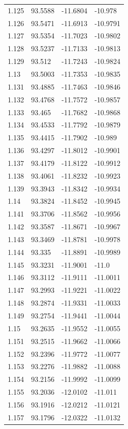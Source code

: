 \begin{tabular}{llll}
1.125 & 93.5588 & -11.6804 & -10.978 \\
1.126 & 93.5471 & -11.6913 & -10.9791 \\
1.127 & 93.5354 & -11.7023 & -10.9802 \\
1.128 & 93.5237 & -11.7133 & -10.9813 \\
1.129 & 93.512 & -11.7243 & -10.9824 \\
1.13 & 93.5003 & -11.7353 & -10.9835 \\
1.131 & 93.4885 & -11.7463 & -10.9846 \\
1.132 & 93.4768 & -11.7572 & -10.9857 \\
1.133 & 93.465 & -11.7682 & -10.9868 \\
1.134 & 93.4533 & -11.7792 & -10.9879 \\
1.135 & 93.4415 & -11.7902 & -10.989 \\
1.136 & 93.4297 & -11.8012 & -10.9901 \\
1.137 & 93.4179 & -11.8122 & -10.9912 \\
1.138 & 93.4061 & -11.8232 & -10.9923 \\
1.139 & 93.3943 & -11.8342 & -10.9934 \\
1.14 & 93.3824 & -11.8452 & -10.9945 \\
1.141 & 93.3706 & -11.8562 & -10.9956 \\
1.142 & 93.3587 & -11.8671 & -10.9967 \\
1.143 & 93.3469 & -11.8781 & -10.9978 \\
1.144 & 93.335 & -11.8891 & -10.9989 \\
1.145 & 93.3231 & -11.9001 & -11.0 \\
1.146 & 93.3112 & -11.9111 & -11.0011 \\
1.147 & 93.2993 & -11.9221 & -11.0022 \\
1.148 & 93.2874 & -11.9331 & -11.0033 \\
1.149 & 93.2754 & -11.9441 & -11.0044 \\
1.15 & 93.2635 & -11.9552 & -11.0055 \\
1.151 & 93.2515 & -11.9662 & -11.0066 \\
1.152 & 93.2396 & -11.9772 & -11.0077 \\
1.153 & 93.2276 & -11.9882 & -11.0088 \\
1.154 & 93.2156 & -11.9992 & -11.0099 \\
1.155 & 93.2036 & -12.0102 & -11.011 \\
1.156 & 93.1916 & -12.0212 & -11.0121 \\
1.157 & 93.1796 & -12.0322 & -11.0132 \\

\end{tabular}

